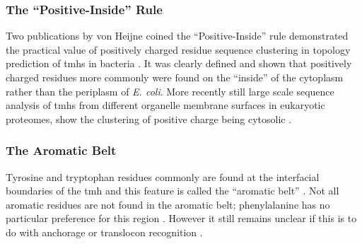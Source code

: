 \subsubsection{The ``Positive-Inside'' Rule}

Two publications by von Heijne coined the ``Positive-Inside'' rule demonstrated the practical value of positively charged residue sequence clustering in topology prediction of \gls{tmh}s in bacteria \cite{VonHeijne1989,VonHeijne1992}. It was clearly defined and shown that positively charged residues more commonly were found on the ``inside'' of the cytoplasm rather than the periplasm of {\it E. coli}. More recently still large scale sequence analysis of \gls{tmh}s from different organelle membrane surfaces in eukaryotic proteomes, show the clustering of positive charge being cytosolic \cite{Sharpe2010, Baeza-Delgado2013, Pogozheva2013}.

\subsubsection{The Aromatic Belt}

 Tyrosine and tryptophan residues commonly are found at the interfacial boundaries of the \gls{tmh} and this feature is called the ``aromatic belt'' \cite{Hessa2005, Granseth2005, Sharpe2010, Baeza-Delgado2013, Nilsson2005}. Not all aromatic residues are not found in the aromatic belt; phenylalanine has no particular preference for this region \cite{Granseth2005, Braun1999}. However it still remains unclear if this is to do with anchorage or translocon recognition \cite{Baeza-Delgado2013}.

